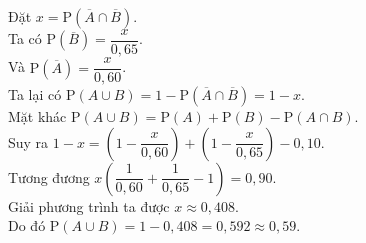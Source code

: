 \begin{ex}
{\begin{center}
	\end{center}
		Đặt $x = \mathrm{P}\left(\overline{A} \cap \overline{B}\right)$.\\
		Ta có $\mathrm{P}\left(\overline{B}\right) = \dfrac{x}{0{,}65}$.\\
		Và $\mathrm{P}\left(\overline{A}\right) = \dfrac{x}{0{,}60}$.\\
		Ta lại có $\mathrm{P}\left(A \cup B\right) = 1 - \mathrm{P}(\overline{A} \cap \overline{B}) = 1 - x$.\\
		Mặt khác $\mathrm{P}(A \cup B) = \mathrm{P}(A) + \mathrm{P}(B) - \mathrm{P}(A \cap B)$.\\
		Suy ra $1 - x = \left( 1 - \dfrac{x}{0{,}60} \right) + \left( 1 - \dfrac{x}{0{,}65} \right) - 0{,}10$.\\
		Tương đương $x \left( \dfrac{1}{0{,}60} + \dfrac{1}{0{,}65} - 1 \right) = 0{,}90$.\\
		Giải phương trình ta được $x \approx 0{,}408$.\\
		Do đó $\mathrm{P}(A \cup B) = 1 - 0{,}408 = 0{,}592 \approx 0{,}59$.
	}
\end{ex}
